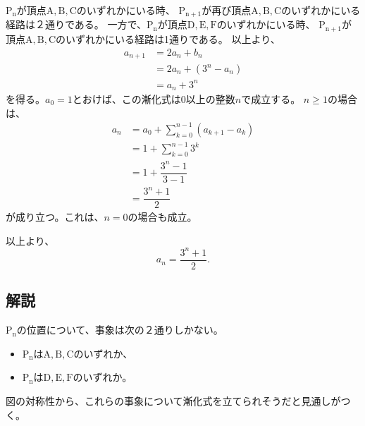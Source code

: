 \documentclass[dvipdfmx,a4paper]{jsarticle}
\newcommand{\2}{I\hspace{-1pt}I}
\newcommand{\3}{I\hspace{-1pt}I\hspace{-1pt}I}
\begin{document}
    $\mathrm{P_n}$が頂点$\mathrm{A,B,C}$のいずれかにいる時、
    $\mathrm{P_{n+1}}$が再び頂点$\mathrm{A,B,C}$のいずれかにいる経路は２通りである。
    一方で、$\mathrm{P_n}$が頂点$\mathrm{D,E,F}$のいずれかにいる時、
    $\mathrm{P_{n+1}}$が頂点$\mathrm{A,B,C}$のいずれかにいる経路は1通りである。
    以上より、
    \begin{align*}
        a_{n+1} &= 2a_n + b_n \\
                &= 2a_n + (3^n-a_n) \\
                &= a_n + 3^n
    \end{align*}
    を得る。$a_0=1$とおけば、この漸化式は0以上の整数$n$で成立する。
    $n \geq 1$の場合は、
    \begin{align*}\displaystyle
        a_n &= a_0 + \sum_{k=0}^{n-1} (a_{k+1} - a_k) \\
            &= 1 + \sum_{k=0}^{n-1} 3^k \\
            &= 1 + \dfrac{3^n-1}{3-1} \\
            &= \dfrac{3^n+1}{2}
    \end{align*}
    が成り立つ。これは、$n=0$の場合も成立。

    以上より、
    \begin{equation*}
        a_n = \dfrac{3^n+1}{2}.
    \end{equation*}
    

    \subsection{解説}
    $\mathrm{P_n}$の位置について、事象は次の２通りしかない。
    \begin{itemize}
        \item $\mathrm{P_n}$は$\mathrm{A, B, C}$のいずれか、
        \item $\mathrm{P_n}$は$\mathrm{D, E, F}$のいずれか。
    \end{itemize}
    図の対称性から、これらの事象について漸化式を立てられそうだと見通しがつく。
\end{document}
